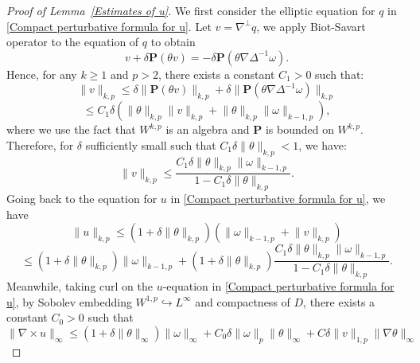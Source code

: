 \documentclass[12pt,letterpaper]{article}
\newcommand{\bP}{\mathbf{P}}
\theoremstyle{plain}
\begin{document}
\begin{proof}[Proof of Lemma~\ref{Estimates of u}]

We first consider the elliptic equation for $q$ in \eqref{Compact perturbative formula for u}. Let $v=\nabla^\perp q$, we apply Biot-Savart operator to the equation of $q$ to obtain
\begin{equation*}
 v+ \delta\bP(\theta v)= -\delta \bP(\theta\nabla\Delta^{-1}\omega). 
\end{equation*}
Hence, for any $k\ge 1$ and $p>2$, there exists a constant $C_1>0$ such that:
\begin{equation*}
\lVert v\rVert_{k,p}\le  \delta \lVert \bP(\theta v)\rVert_{k,p} +\delta  \lVert\bP(\theta\nabla\Delta^{-1}\omega)\rVert_{k,p}
\end{equation*}
\begin{equation*}
 \le  C_1 \delta  (\lVert \theta\rVert_{k,p}\lVert v\rVert_{k,p}+\lVert \theta\rVert_{k,p}\lVert \omega\rVert_{k-1,p}),
\end{equation*}
where we use the fact that $W^{k,p}$ is an algebra and $\bP$ is bounded on $W^{k,p}$. Therefore, for $\delta$ sufficiently small such that $C_1\delta\lVert\theta\rVert_{k,p}<1$, we have:
\begin{equation*}
\lVert v\rVert_{k,p}\le \frac{C_1\delta \lVert \theta\rVert_{k,p}\lVert \omega\rVert_{k-1,p}}{1-C_1\delta \lVert \theta\rVert_{k,p}}    .
\end{equation*}
Going back to the equation for $u$ in \eqref{Compact perturbative formula for u}, we have
\begin{equation*}
 \lVert u\rVert_{k,p}\le  (1+\delta \lVert\theta\rVert_{k,p})(\lVert\omega\rVert_{k-1,p}+\lVert v\rVert_{k,p})
\end{equation*}
\begin{equation}\label{u Wk,p Estimate}
 \le (1+\delta \lVert\theta\rVert_{k,p})\lVert\omega\rVert_{k-1,p}+(1+\delta \lVert\theta\rVert_{k,p})\frac{C_1\delta \lVert \theta\rVert_{k,p}\lVert \omega\rVert_{k-1,p}}{1-C_1\delta \lVert \theta\rVert_{k,p}}.   
\end{equation}
Meanwhile, taking curl on the $u$-equation in \eqref{Compact perturbative formula for u}, by Sobolev embedding $W^{1,p}\hookrightarrow L^\infty$ and compactness of $D$, there exists a constant $C_0>0$ such that
\begin{equation*}
 \lVert \nabla\times u\rVert_\infty\le (1+\delta\lVert\theta \rVert_{\infty})\lVert \omega\rVert_\infty+ C_0\delta\lVert \omega\rVert_{p}\lVert\theta\rVert_\infty +C\delta \lVert v\rVert_{1,p}\lVert \nabla\theta\rVert_\infty   

\end{equation*}
\end{proof}
\end{document}
